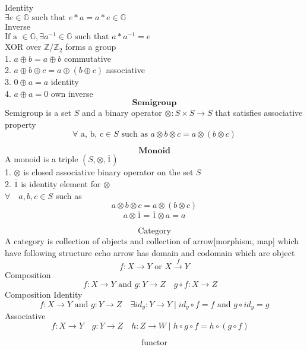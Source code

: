 \documentclass{book}
\begin{document}
Identity\\
$ \exists \mathit{e} \in \mathbb{G} \text{ such that } \mathit{e}*a = a*\mathit{e} \in \mathbb{G}$\\

Inverse\\
$ \text{If a } \in \mathbb{G}, \exists a^{-1} \in \mathbb{G} \text{ such that } a*a^{-1} = e $\\

XOR over $\mathbb{Z}/\mathbb{Z}_2$ forms a group\\
1. $ a \oplus b = a \oplus b $ commutative\\ 
2. $ a \oplus b \oplus c = a \oplus (b \oplus c) $ associative\\ 
3. $ 0 \oplus a = a $ identity\\ 
4. $ a \oplus a = 0 $ own inverse\\  

\[ \textbf{ Semigroup } \]
Semigroup is a set $S$ and a binary operator $\otimes \colon S \times S \rightarrow S$ that satisfies 
associative property\\ 
\[ \forall \text{ a, b, c} \in S \text{ such as } a \otimes b\otimes c = a \otimes (b \otimes c) \]

\[ \textbf{ Monoid } \]
A monoid is a triple $(S, \otimes, \overline{1})$ \\
1. $\otimes$ is closed associative binary operator on the set $S$ \\
2. $\overline{1}$ is identity element for $\otimes$ \\
$\forall\quad a, b, c \in S$ such as\\
\[ a \otimes b  \otimes c = a \otimes (b \otimes c)   \]
\[ a \otimes \overline{1} = \overline{1} \otimes a =  a  \]

\newpage
\[ \text{ Category } \]
A category is collection of objects and collection of arrow[morphism, map] which have following structure
echo arrow has domain and codomain which are object     
\[ f \colon X \rightarrow Y \text{ or } X \xrightarrow{f} Y\]
Composition
\[ f \colon X \rightarrow Y \text{ and } g \colon Y \rightarrow Z \quad g \circ f \colon X \rightarrow Z \quad \]
Composition Identity
\[ f \colon X \rightarrow Y \text{ and } g \colon Y \rightarrow Z  \quad \exists id_y \colon Y \rightarrow Y \mid id_y \circ f = f \text{ and } g \circ id_y = g \]
Associative
\[ f \colon X \rightarrow Y \quad g \colon Y \rightarrow Z \quad h \colon Z \rightarrow W \mid h \circ g \circ f = h \circ (g \circ f) \quad \]

\[ \text{functor} \]
\end{document}
